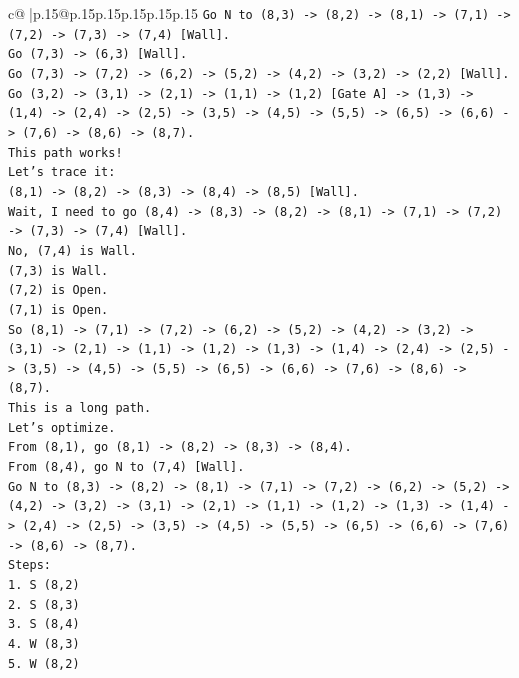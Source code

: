 \documentclass{article}
\begin{document}
{\begin{supertabular}{c@{$\;$}|p{.15\linewidth}@{}p{.15\linewidth}p{.15\linewidth}p{.15\linewidth}p{.15\linewidth}p{.15\linewidth}}
{{{\texttt{Go N to (8,3) {-}> (8,2) {-}> (8,1) {-}> (7,1) {-}> (7,2) {-}> (7,3) {-}> (7,4) {[}Wall{]}.} \\
\texttt{Go (7,3) {-}> (6,3) {[}Wall{]}.} \\
\texttt{Go (7,3) {-}> (7,2) {-}> (6,2) {-}> (5,2) {-}> (4,2) {-}> (3,2) {-}> (2,2) {[}Wall{]}.} \\
\texttt{Go (3,2) {-}> (3,1) {-}> (2,1) {-}> (1,1) {-}> (1,2) {[}Gate A{]} {-}> (1,3) {-}> (1,4) {-}> (2,4) {-}> (2,5) {-}> (3,5) {-}> (4,5) {-}> (5,5) {-}> (6,5) {-}> (6,6) {-}> (7,6) {-}> (8,6) {-}> (8,7).} \\
\texttt{This path works!} \\
\texttt{Let's trace it:} \\
\texttt{(8,1) {-}> (8,2) {-}> (8,3) {-}> (8,4) {-}> (8,5) {[}Wall{]}.} \\
\texttt{Wait, I need to go (8,4) {-}> (8,3) {-}> (8,2) {-}> (8,1) {-}> (7,1) {-}> (7,2) {-}> (7,3) {-}> (7,4) {[}Wall{]}.} \\
\texttt{No, (7,4) is Wall.} \\
\texttt{(7,3) is Wall.} \\
\texttt{(7,2) is Open.} \\
\texttt{(7,1) is Open.} \\
\texttt{So (8,1) {-}> (7,1) {-}> (7,2) {-}> (6,2) {-}> (5,2) {-}> (4,2) {-}> (3,2) {-}> (3,1) {-}> (2,1) {-}> (1,1) {-}> (1,2) {-}> (1,3) {-}> (1,4) {-}> (2,4) {-}> (2,5) {-}> (3,5) {-}> (4,5) {-}> (5,5) {-}> (6,5) {-}> (6,6) {-}> (7,6) {-}> (8,6) {-}> (8,7).} \\
\texttt{This is a long path.} \\
\texttt{Let's optimize.} \\
\texttt{From (8,1), go (8,1) {-}> (8,2) {-}> (8,3) {-}> (8,4).} \\
\texttt{From (8,4), go N to (7,4) {[}Wall{]}.} \\
\texttt{Go N to (8,3) {-}> (8,2) {-}> (8,1) {-}> (7,1) {-}> (7,2) {-}> (6,2) {-}> (5,2) {-}> (4,2) {-}> (3,2) {-}> (3,1) {-}> (2,1) {-}> (1,1) {-}> (1,2) {-}> (1,3) {-}> (1,4) {-}> (2,4) {-}> (2,5) {-}> (3,5) {-}> (4,5) {-}> (5,5) {-}> (6,5) {-}> (6,6) {-}> (7,6) {-}> (8,6) {-}> (8,7).} \\
\texttt{Steps:} \\
\texttt{1. S (8,2)} \\
\texttt{2. S (8,3)} \\
\texttt{3. S (8,4)} \\
\texttt{4. W (8,3)} \\
\texttt{5. W (8,2)} \\
}}}
\end{supertabular}}
\end{document}

